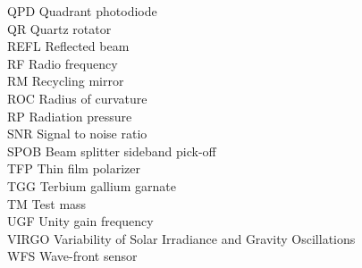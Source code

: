 \begin{tabbing}
QPD \> Quadrant photodiode \\
QR \> Quartz rotator \\
REFL \> Reflected beam \\
RF \> Radio frequency \\
RM \> Recycling mirror \\
ROC \> Radius of curvature \\
RP \> Radiation pressure \\
SNR \> Signal to noise ratio \\
SPOB \> Beam splitter sideband pick-off \\
TFP \> Thin film polarizer \\
TGG \> Terbium gallium garnate \\
TM \> Test mass \\
UGF \> Unity gain frequency \\
VIRGO \> Variability of Solar Irradiance and Gravity Oscillations \\
WFS \> Wave-front sensor 
\end{tabbing}
